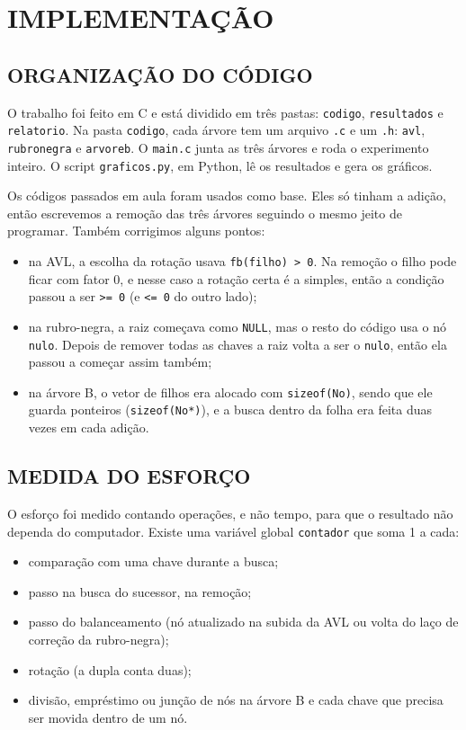 \section{IMPLEMENTAÇÃO}

\subsection{ORGANIZAÇÃO DO CÓDIGO}

O trabalho foi feito em C e está dividido em três pastas: \texttt{codigo}, \texttt{resultados} e \texttt{relatorio}. Na pasta \texttt{codigo}, cada árvore tem um arquivo \texttt{.c} e um \texttt{.h}: \texttt{avl}, \texttt{rubronegra} e \texttt{arvoreb}. O \texttt{main.c} junta as três árvores e roda o experimento inteiro. O script \texttt{graficos.py}, em Python, lê os resultados e gera os gráficos.

Os códigos passados em aula foram usados como base. Eles só tinham a adição, então escrevemos a remoção das três árvores seguindo o mesmo jeito de programar. Também corrigimos alguns pontos:

\begin{itemize}
\item na AVL, a escolha da rotação usava \texttt{fb(filho) > 0}. Na remoção o filho pode ficar com fator 0, e nesse caso a rotação certa é a simples, então a condição passou a ser \texttt{>= 0} (e \texttt{<= 0} do outro lado);
\item na rubro-negra, a raiz começava como \texttt{NULL}, mas o resto do código usa o nó \texttt{nulo}. Depois de remover todas as chaves a raiz volta a ser o \texttt{nulo}, então ela passou a começar assim também;
\item na árvore B, o vetor de filhos era alocado com \texttt{sizeof(No)}, sendo que ele guarda ponteiros (\texttt{sizeof(No*)}), e a busca dentro da folha era feita duas vezes em cada adição.
\end{itemize}

\subsection{MEDIDA DO ESFORÇO}

O esforço foi medido contando operações, e não tempo, para que o resultado não dependa do computador. Existe uma variável global \texttt{contador} que soma 1 a cada:

\begin{itemize}
\item comparação com uma chave durante a busca;
\item passo na busca do sucessor, na remoção;
\item passo do balanceamento (nó atualizado na subida da AVL ou volta do laço de correção da rubro-negra);
\item rotação (a dupla conta duas);
\item divisão, empréstimo ou junção de nós na árvore B e cada chave que precisa ser movida dentro de um nó.
\end{itemize}

